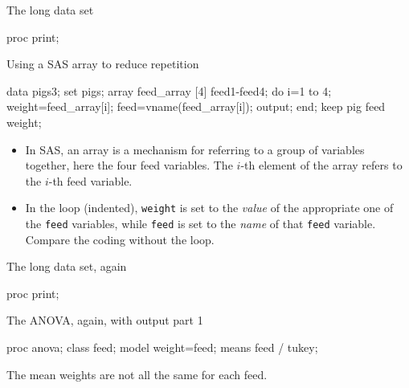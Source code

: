 \documentclass[unknownkeysallowed]{beamer}\usepackage[]{graphicx}\usepackage[]{color}
\begin{document}
\begin{frame}[fragile]{The long data set}
  
  \begin{Sascode}[store=to]
proc print;    
  \end{Sascode}
  
  
\end{frame}

\begin{frame}[fragile]{Using a SAS array to reduce repetition}

  \begin{Datastep}
data pigs3;
  set pigs;
  array feed_array [4] feed1-feed4;
  do i=1 to 4;
    weight=feed_array[i];
    feed=vname(feed_array[i]);
    output;
  end;
  keep pig feed weight;
  \end{Datastep}
  
  \begin{itemize}
  \item   In SAS, an array is a mechanism for referring to a group of
  variables together, here the four feed variables. The $i$-th element
  of the array refers to the $i$-th feed variable.
\item In the loop (indented), \texttt{weight} is set to the
  \emph{value} of the appropriate one of the \texttt{feed} variables,
  while \texttt{feed} is set to the \emph{name} of that \texttt{feed}
  variable. Compare the coding without the loop.
  \end{itemize}
  
  
\end{frame}

\begin{frame}[fragile]{The long data set, again}
  
  \begin{Sascode}[store=tp]
proc print;    
  \end{Sascode}
  
  
\end{frame}

\begin{frame}[fragile]{The ANOVA, again, with output part 1}
  
  \begin{Sascode}[store=tr]
proc anova;
  class feed;
  model weight=feed;
  means feed / tukey;
  \end{Sascode}
  

The mean weights are not all the same for each feed.

\end{frame}
\end{document}

